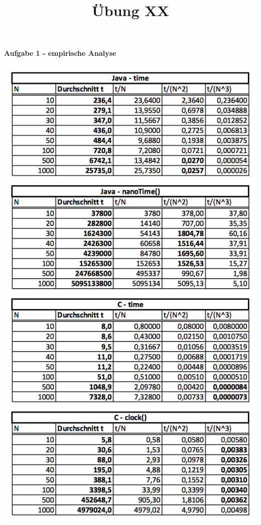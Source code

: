 \documentclass[a4paper,11pt]{scrartcl}
\title{Übung XX}
\begin{document}
\begin{center}
\LARGE{\textbf{Aufgabe 1 - empirische Analyse}}
\end{center}

\includegraphics[width=.7\textwidth]{empirischer_test.png}
\end{document}
